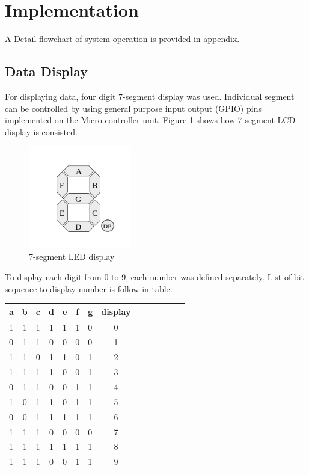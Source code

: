 \documentclass{article}
\begin{document}
\section{Implementation}
A Detail flowchart of system operation is provided in appendix.
\subsection{Data Display}
For displaying data, four digit 7-segment display was used. Individual segment can be controlled by using general purpose input output (GPIO) pins implemented on the Micro-controller unit. Figure 1 shows how 7-segment LCD display is consisted.

\begin{figure}[!htb]
\begin{center}
\includegraphics[width=0.40\textwidth]{7segment} %
\caption{7-segment LED display}
\end{center}
\end{figure}

To display each digit from 0 to 9, each number was defined separately. List of bit sequence to display number is follow in table.\\
\begin{center}
\begin{tabular}{lclclclclclc|cl}
a&b&c&d&e&f&g&display\\
\hline
1&1&1&1&1&1&0&0\\
0&1&1&0&0&0&0&1\\
1&1&0&1&1&0&1&2\\
1&1&1&1&0&0&1&3\\
0&1&1&0&0&1&1&4\\
1&0&1&1&0&1&1&5\\
0&0&1&1&1&1&1&6\\
1&1&1&0&0&0&0&7\\
1&1&1&1&1&1&1&8\\
1&1&1&0&0&1&1&9
\end{tabular}
\end{center}
\end{document}
